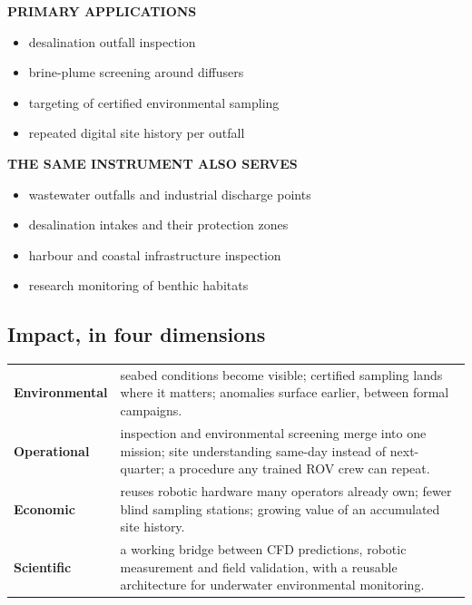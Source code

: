 \documentclass[10pt,a4paper]{article}
\begin{document}
\noindent
\begin{minipage}[t]{0.485\textwidth}
\begin{tealpanel}
{\sffamily\bfseries\color{teal}PRIMARY APPLICATIONS}\\[3pt]
\small
\begin{itemize}
  \item desalination outfall inspection
  \item brine-plume screening around diffusers
  \item targeting of certified environmental sampling
  \item repeated digital site history per outfall
\end{itemize}
\end{tealpanel}
\end{minipage}\hfill
\begin{minipage}[t]{0.485\textwidth}
\begin{panel}
{\sffamily\bfseries\color{deepblue}THE SAME INSTRUMENT ALSO SERVES}\\[3pt]
\small
\begin{itemize}
  \item wastewater outfalls and industrial discharge points
  \item desalination intakes and their protection zones
  \item harbour and coastal infrastructure inspection
  \item research monitoring of benthic habitats
\end{itemize}
\end{panel}
\end{minipage}

\subsection*{\sffamily\color{deepblue}Impact, in four dimensions}

\small
\begin{tabularx}{\textwidth}{@{}p{2.6cm}>{\raggedright\arraybackslash}X@{}}
\textbf{\color{teal}Environmental} & seabed conditions become visible; certified sampling lands where it matters; anomalies surface earlier, between formal campaigns.\\[4pt]
\textbf{\color{teal}Operational} & inspection and environmental screening merge into one mission; site understanding same-day instead of next-quarter; a procedure any trained ROV crew can repeat.\\[4pt]
\textbf{\color{teal}Economic} & reuses robotic hardware many operators already own; fewer blind sampling stations; growing value of an accumulated site history.\\[4pt]
\textbf{\color{teal}Scientific} & a working bridge between CFD predictions, robotic measurement and field validation, with a reusable architecture for underwater environmental monitoring.\\
\end{tabularx}
\normalsize
\end{document}
